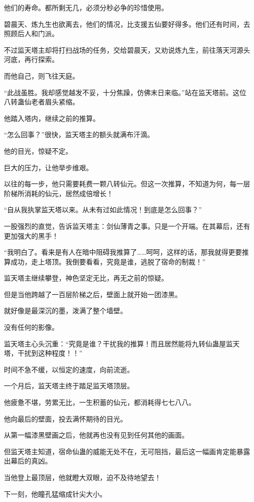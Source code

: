 \begin{this_body}
他们的寿命。都所剩无几，必须分秒必争的珍惜使用。

碧晨天、炼九生也欲离去，他们的情况，比支援五仙要好得多。他们还有时间，去照顾后人和门派。

不过监天塔主却将打扫战场的任务，交给碧晨天，又劝说炼九生，前往落天河源头河底，再行探索。

而他自己，则飞往天庭。

“此战虽胜。我却感觉越发不妥，十分焦躁，仿佛末日来临。”站在监天塔前。这位八转蛊仙老者眉头紧缩。

他踏入塔内，继续之前的推算。

“怎么回事？”很快，监天塔主的额头就满布汗滴。

他的目光，惊疑不定。

巨大的压力，让他举步维艰。

以往的每一步，他只需要耗费一颗八转仙元。但这一次推算，不知道为何，每一层阶梯所消耗的仙元，居然成倍增长！

“自从我执掌监天塔以来。从未有过如此情况！到底是怎么回事？”

一股强烈的直觉，告诉监天塔主：剑仙薄青之事。只是一个开端。在其幕后，还有更加强大的黑手！

“我明白了。看来是有人在暗中阻碍我推算了……呵呵，这样的话，那我就得更要推算成功，走上塔顶。我倒要看看，究竟是谁，逃脱了宿命的制裁！”

监天塔主继续攀登，神色坚定无比，再无之前的惊疑。

但是当他跨越了一百层阶梯之后，壁面上就开始一团漆黑。

就好像是最深沉的墨，泼满了整个墙壁。

没有任何的影像。

监天塔主心头沉重：“究竟是谁？干扰我的推算！而且居然能将九转仙蛊屋监天塔，干扰到这种程度！！”

时间不急不缓，以恒定的速度，向前流逝。

一个月后，监天塔主终于踏足监天塔顶层。

他疲惫不堪，劳累无比，一生积蓄的仙元，都消耗得七七八八。

他向最后的壁面，投去满怀期待的目光。

从第一幅漆黑壁画之后，他就再也没有见到任何其他的画面。

但监天塔主知道，宿命仙蛊的威能无处不在，无可阻挡，最后这一幅画肯定能暴露出幕后的真凶。

当他登上最顶层，他就瞪大双眼，迫不及待地望去！

下一刻，他瞳孔猛缩成针尖大小。


\end{this_body}
